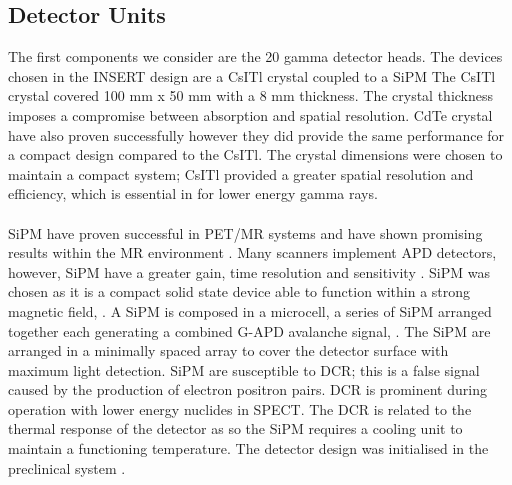 \subsection{Detector Units}
The first components we consider are the 20 gamma detector heads.  The devices chosen in the INSERT design are a \acrlong{CsITl} crystal coupled to a \acrshort{SiPM} \cite{7430864} \cite{Occhipinti2016AApplications.} The \acrshort{CsITl} crystal covered 100 mm x 50 mm with a 8 mm thickness. The crystal thickness imposes a compromise between absorption and spatial resolution. \acrshort{CdTe} crystal have also proven successfully \cite{Cai2010ADetectors} however they did provide the same performance for a compact design compared to the \acrshort{CsITl}. The crystal dimensions were chosen to maintain a compact system; \acrshort{CsITl} provided a greater spatial resolution and efficiency, which is essential in for lower energy gamma rays.

\paragraph{}

\acrshort{SiPM} have proven successful in \acrshort{PET/MR} systems and have shown promising results within the \acrshort{MR} environment \cite{MCELROY2007106}. Many scanners implement \acrshort{APD} detectors, however, \acrshort{SiPM} have a greater gain, time resolution and sensitivity \cite{RENKER200648} \cite{Wagatsuma2017ComparisonTOF-PET/CT}.  \acrshort{SiPM} was chosen as it is a compact solid state device able to function within a strong magnetic field, \cite{SCHAART201631} \cite{0031-9155-56-23-014} \cite{DINU2015367}. A \acrshort{SiPM} is composed in a microcell, a series of \acrshort{SiPM} arranged together each generating a combined \acrshort{G-APD} avalanche signal, \cite{DINU2015367}. The \acrshort{SiPM} are arranged in a minimally spaced array to cover the detector surface with maximum light detection. \acrshort{SiPM} are susceptible to \acrlong{DCR}; this is a false signal caused by the production of electron positron pairs. \acrshort{DCR} is prominent during operation with lower energy nuclides in \acrshort{SPECT}. The \acrshort{DCR} is related to the thermal response of the detector as so the \acrshort{SiPM} requires a cooling unit to maintain a functioning temperature. The detector design was initialised in the preclinical system \cite{7287793}.

